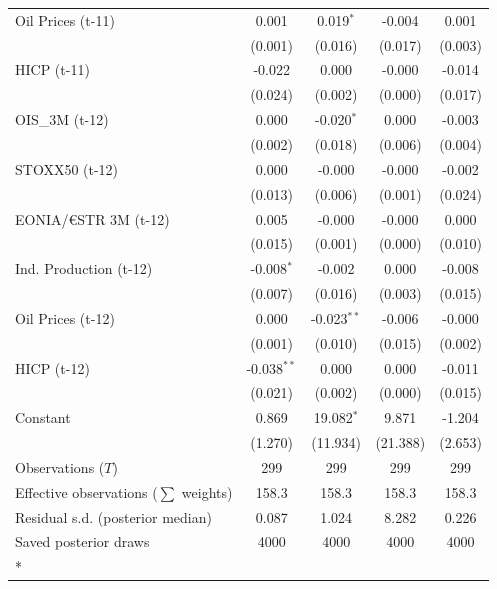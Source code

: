 \begin{longtable}[t]{lcccc}
Oil Prices (t-11) & 0.001 & 0.019$^{*}$ & -0.004 & 0.001\\
 & (0.001) & (0.016) & (0.017) & (0.003)\\
HICP (t-11) & -0.022 & 0.000 & -0.000 & -0.014\\
 & (0.024) & (0.002) & (0.000) & (0.017)\\
OIS\_3M (t-12) & 0.000 & -0.020$^{*}$ & 0.000 & -0.003\\
 & (0.002) & (0.018) & (0.006) & (0.004)\\
STOXX50 (t-12) & 0.000 & -0.000 & -0.000 & -0.002\\
 & (0.013) & (0.006) & (0.001) & (0.024)\\
EONIA/€STR 3M (t-12) & 0.005 & -0.000 & -0.000 & 0.000\\
 & (0.015) & (0.001) & (0.000) & (0.010)\\
Ind. Production (t-12) & -0.008$^{*}$ & -0.002 & 0.000 & -0.008\\
 & (0.007) & (0.016) & (0.003) & (0.015)\\
Oil Prices (t-12) & 0.000 & -0.023$^{**}$ & -0.006 & -0.000\\
 & (0.001) & (0.010) & (0.015) & (0.002)\\
HICP (t-12) & -0.038$^{**}$ & 0.000 & 0.000 & -0.011\\
 & (0.021) & (0.002) & (0.000) & (0.015)\\
Constant & 0.869 & 19.082$^{*}$ & 9.871 & -1.204\\
 & (1.270) & (11.934) & (21.388) & (2.653)\\
\midrule
Observations ($T$) & 299 & 299 & 299 & 299\\
Effective observations ($\sum$ weights) & 158.3 & 158.3 & 158.3 & 158.3\\
Residual s.d. (posterior median) & 0.087 & 1.024 & 8.282 & 0.226\\
Saved posterior draws & 4000 & 4000 & 4000 & 4000\\*
\end{longtable}
\endgroup{}

